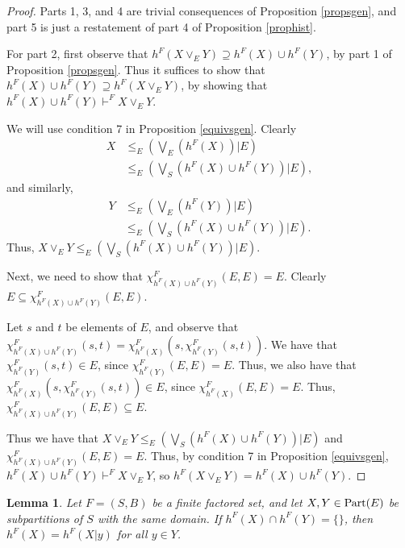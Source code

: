 \documentclass[authordate,onecolumn]{miri-tech-article}
\newtheorem{lemma2}{Lemma}
\begin{document}
\begin{proof}
Parts 1, 3, and 4 are trivial consequences of Proposition \ref{propsgen}, and part 5 is just a restatement of part 4 of Proposition \ref{prophist}.

For part 2, first observe that $h^F(X\vee_E Y)\supseteq h^F(X)\cup h^F(Y)$, by part 1 of Proposition \ref{propsgen}. Thus it suffices to show that $h^F(X)\cup h^F(Y)\supseteq h^F(X\vee_E Y)$, by showing that $h^F(X)\cup h^F(Y)\vdash^F X\vee_E Y$.

We will use condition 7 in Proposition \ref{equivsgen}. Clearly
\begin{equation} \begin{split} X & \leq_E({\bigvee}_E (h^F(X))|E) \\ & \leq_E({\bigvee}_S(h^F(X)\cup h^F(Y))|E),\end{split} \end{equation}
and similarly,
\begin{equation} \begin{split} Y & \leq_E({\bigvee}_E(h^F(Y))|E) \\ & \leq_E({\bigvee}_S(h^F(X)\cup h^F(Y))|E).\end{split} \end{equation}
Thus, $X\vee_E Y \leq_E (\bigvee_S(h^F(X)\cup h^F(Y))|E)$. 

Next, we need to show that $\chi_{h^F(X)\cup h^F(Y)}^F(E,E)=E$. Clearly $E\subseteq \chi_{h^F(X)\cup h^F(Y)}^F(E,E)$. 

Let $s$ and $t$ be elements of $E$, and observe that  $\chi_{h^F(X)\cup h^F(Y)}^F(s,t)=\chi_{h^F(X)}^F(s,\chi_{h^F(Y)}^F(s,t))$. We have that $\chi_{h^F(Y)}^F(s,t)\in E$, since $\chi_{h^F(Y)}^F(E,E)= E$. Thus, we also have that $\chi_{h^F(X)}^F(s,\chi_{h^F(Y)}^F(s,t))\in E$, since $\chi_{h^F(X)}^F(E,E)= E$. Thus, $\chi_{h^F(X)\cup h^F(Y)}^F(E,E)\subseteq E$.

Thus we have that $X\vee_E Y \leq_E (\bigvee_S(h^F(X)\cup h^F(Y))|E)$ and $\chi_{h^F(X)\cup h^F(Y)}^F(E,E)=E$. Thus, by condition 7 in Proposition \ref{equivsgen}, $h^F(X)\cup h^F(Y)\vdash^F X\vee_E Y$, so $h^F(X\vee_E Y)=h^F(X)\cup h^F(Y)$.
\end{proof}
\begin{lemma2}\label{histlemma1}
Let $F=(S,B)$ be a finite factored set, and let $X,Y\in \parts[E]$ be subpartitions of $S$ with the same domain. If $h^F(X)\cap h^F(Y)=\{\}$, then $h^F(X)=h^F(X|y)$ for all $y\in Y$.
\end{lemma2}
\end{document}
